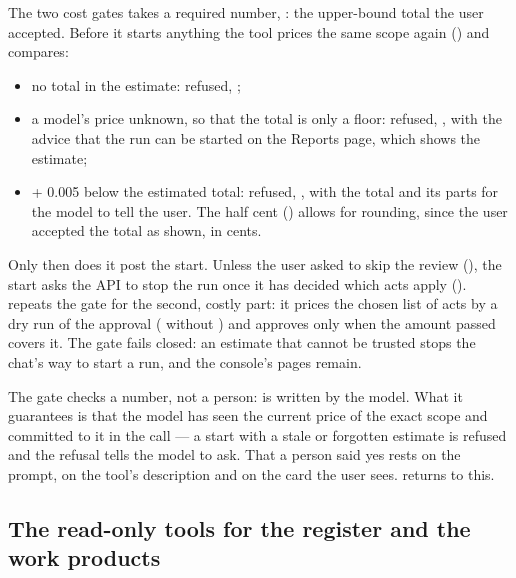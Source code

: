 \begin{codebox}{The two cost gates}
 takes a required number, : the upper-bound
total the user accepted. Before it starts anything the tool prices the same scope again
() and compares:
\begin{itemize}
  \item no total in the estimate: refused, ;
  \item a model's price unknown, so that the total is only a floor: refused,
    , with the advice that the run can be started on the Reports page, which
    shows the estimate;
  \item {} + 0.005 below the estimated total: refused,
    , with the total and its parts for the model to tell the user.
    The half cent () allows for rounding, since the user accepted the
    total as shown, in cents.
\end{itemize}
Only then does it post the start. Unless the user asked to skip the review
(), the start asks the API to stop the run once it has decided which acts
apply ().  repeats the gate for the second, costly
part: it prices the chosen list of acts by a dry run of the approval
( without ) and approves only when the
amount passed covers it. The gate fails closed: an estimate that cannot be trusted stops the
chat's way to start a run, and the console's pages remain.
\end{codebox}

The gate checks a number, not a person:  is written by the model. What
it guarantees is that the model has seen the current price of the exact scope and committed to
it in the call --- a start with a stale or forgotten estimate is refused and the refusal tells
the model to ask. That a person said yes rests on the prompt, on the tool's description and on
the card the user sees.  returns to this.

\subsection{The read-only tools for the register and the work products}

